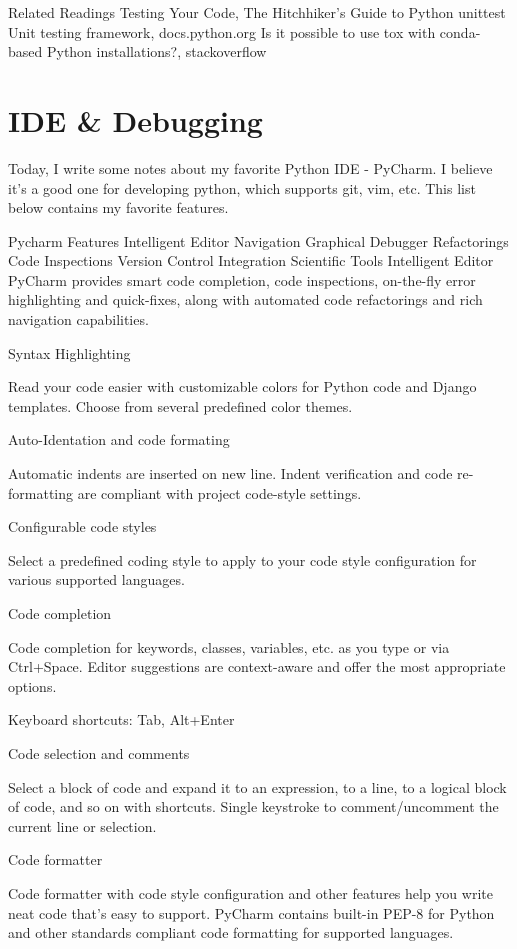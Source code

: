 Related Readings
Testing Your Code, The Hitchhiker's Guide to Python
unittest  Unit testing framework, docs.python.org
Is it possible to use tox with conda-based Python installations?, stackoverflow

\section{IDE \& Debugging}

Today, I write some notes about my favorite Python IDE - PyCharm. I believe it's a good one for developing python, which supports git, vim, etc. This list below contains my favorite features.

Pycharm Features
Intelligent Editor
Navigation
Graphical Debugger
Refactorings
Code Inspections
Version Control Integration
Scientific Tools
Intelligent Editor
PyCharm provides smart code completion, code inspections, on-the-fly error highlighting and quick-fixes, along with automated code refactorings and rich navigation capabilities.

Syntax Highlighting

Read your code easier with customizable colors for Python code and Django templates. Choose from several predefined color themes.

Auto-Identation and code formating

Automatic indents are inserted on new line. Indent verification and code re-formatting are compliant with project code-style settings.

Configurable code styles

Select a predefined coding style to apply to your code style configuration for various supported languages.

Code completion

Code completion for keywords, classes, variables, etc. as you type or via Ctrl+Space. Editor suggestions are context-aware and offer the most appropriate options.

Keyboard shortcuts: Tab, Alt+Enter

Code selection and comments

Select a block of code and expand it to an expression, to a line, to a logical block of code, and so on with shortcuts. Single keystroke to comment/uncomment the current line or selection.

Code formatter

Code formatter with code style configuration and other features help you write neat code that's easy to support. PyCharm contains built-in PEP-8 for Python and other standards compliant code formatting for supported languages.

